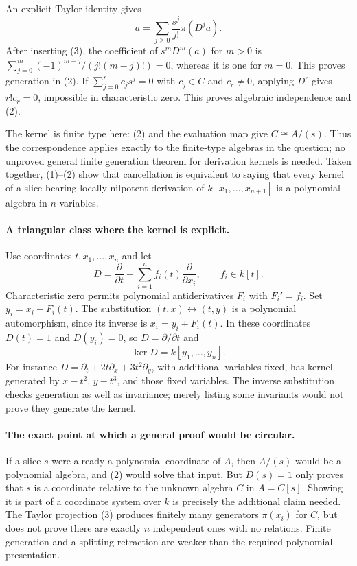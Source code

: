 \documentclass[11pt]{article}
\begin{document}
An explicit Taylor identity gives
\[
 a=\sum_{j\ge0}\frac{s^j}{j!}\pi(D^j a).              \tag{4}
\]
After inserting (3), the coefficient of $s^mD^m(a)$ for $m>0$ is
$\sum_{j=0}^m(-1)^{m-j}/(j!(m-j)!)=0$, whereas it is one for
$m=0$. This proves generation in (2). If
$\sum_{j=0}^r c_js^j=0$ with $c_j\in C$ and $c_r\ne0$, applying
$D^r$ gives $r!c_r=0$, impossible in characteristic zero. This proves
algebraic independence and (2).

The kernel is finite type here: (2) and the evaluation map give
$C\cong A/(s)$. Thus the correspondence applies exactly to the
finite-type algebras in the question; no unproved general finite
generation theorem for derivation kernels is needed. Taken together,
(1)--(2) show that cancellation is equivalent to saying that every
kernel of a slice-bearing locally nilpotent derivation of
$k[x_1,\ldots,x_{n+1}]$ is a polynomial algebra in $n$ variables.

\paragraph{A triangular class where the kernel is explicit.}
Use coordinates $t,x_1,\ldots,x_n$ and let
\[
 D=\frac{\partial}{\partial t}
       +\sum_{i=1}^n f_i(t)\frac{\partial}{\partial x_i},
 \qquad f_i\in k[t].
\]
Characteristic zero permits polynomial antiderivatives $F_i$ with
$F_i'=f_i$. Set $y_i=x_i-F_i(t)$. The substitution
$(t,x)\leftrightarrow(t,y)$ is a polynomial automorphism, since its
inverse is $x_i=y_i+F_i(t)$. In these coordinates $D(t)=1$ and
$D(y_i)=0$, so $D=\partial/\partial t$ and
\[
 \ker D=k[y_1,\ldots,y_n].                            \tag{5}
\]
For instance $D=\partial_t+2t\partial_x+3t^2\partial_y$, with
additional variables fixed, has kernel generated by $x-t^2$, $y-t^3$,
and those fixed variables. The inverse substitution checks generation
as well as invariance; merely listing some invariants would not prove
they generate the kernel.

\paragraph{The exact point at which a general proof would be circular.}
If a slice $s$ were already a polynomial coordinate of $A$, then
$A/(s)$ would be a polynomial algebra, and (2) would solve that input.
But $D(s)=1$ only proves that $s$ is a coordinate relative to the
unknown algebra $C$ in $A=C[s]$. Showing it is part of a coordinate
system over $k$ is precisely the additional claim needed. The Taylor
projection (3) produces finitely many generators $\pi(x_i)$ for $C$,
but does not prove there are exactly $n$ independent ones with no
relations. Finite generation and a splitting retraction are weaker
than the required polynomial presentation.
\end{document}
